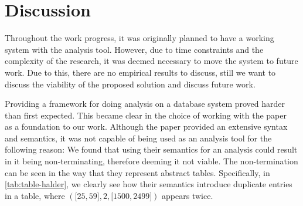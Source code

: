 \section{Discussion}\label{sec:discussion}



Throughout the work progress, it was originally planned to have a working system with the analysis tool.
However,
due to time constraints and the complexity of the research,
it was deemed necessary to move the system to future work.
Due to this, there are no empirical results to discuss, still we want to discuss the viability of the proposed solution and discuss future work.


Providing a framework for doing analysis on a database system proved harder than first expected.
This became clear in the choice of working with the paper~\cite{halder_abstract_2012} as a foundation to our work.
Although the paper provided an extensive syntax and semantics, it was not capable of being used as an analysis tool for the following reason:
We found that using their semantics for an analysis could result in it being non-terminating,
therefore deeming it not viable.
The non-termination can be seen in the way that they represent abstract tables.
Specifically, in \autoref{tab:table-halder},
we clearly see how their semantics introduce duplicate entries in a table, where $({[}25,59{]},2,{[}1500,2499{]})$ appears twice.


